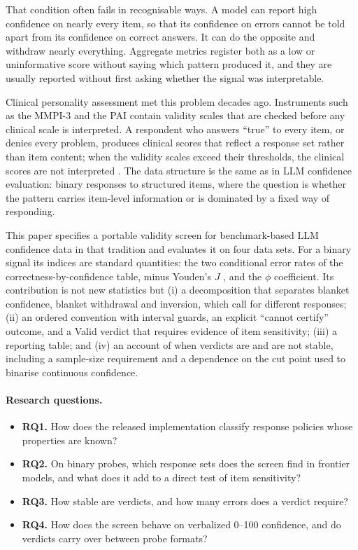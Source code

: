 \documentclass[11pt,a4paper]{article}
\begin{document}
That condition often fails in recognisable ways. A model can report high confidence on nearly every item, so that its confidence on errors cannot be told apart from its confidence on correct answers. It can do the opposite and withdraw nearly everything. Aggregate metrics register both as a low or uninformative score without saying which pattern produced it, and they are usually reported without first asking whether the signal was interpretable.

Clinical personality assessment met this problem decades ago. Instruments such as the MMPI-3 \citep{benporath2020mmpi3} and the PAI \citep{morey1991,morey2007} contain validity scales that are checked before any clinical scale is interpreted. A respondent who answers ``true'' to every item, or denies every problem, produces clinical scores that reflect a response set rather than item content; when the validity scales exceed their thresholds, the clinical scores are not interpreted \citep{vanscoyoc2017,burchett2022}. The data structure is the same as in LLM confidence evaluation: binary responses to structured items, where the question is whether the pattern carries item-level information or is dominated by a fixed way of responding.

This paper specifies a portable validity screen for benchmark-based LLM confidence data in that tradition and evaluates it on four data sets. For a binary signal its indices are standard quantities: the two conditional error rates of the correctness-by-confidence table, minus Youden's $J$ \citep{youden1950}, and the $\phi$ coefficient. Its contribution is not new statistics but (i) a decomposition that separates blanket confidence, blanket withdrawal and inversion, which call for different responses; (ii) an ordered convention with interval guards, an explicit ``cannot certify'' outcome, and a Valid verdict that requires evidence of item sensitivity; (iii) a reporting table; and (iv) an account of when verdicts are and are not stable, including a sample-size requirement and a dependence on the cut point used to binarise continuous confidence.

\paragraph{Research questions.}
\begin{itemize}
\item \textbf{RQ1.} How does the released implementation classify response policies whose properties are known?
\item \textbf{RQ2.} On binary probes, which response sets does the screen find in frontier models, and what does it add to a direct test of item sensitivity?
\item \textbf{RQ3.} How stable are verdicts, and how many errors does a verdict require?
\item \textbf{RQ4.} How does the screen behave on verbalized 0--100 confidence, and do verdicts carry over between probe formats?
\end{itemize}
\end{document}
